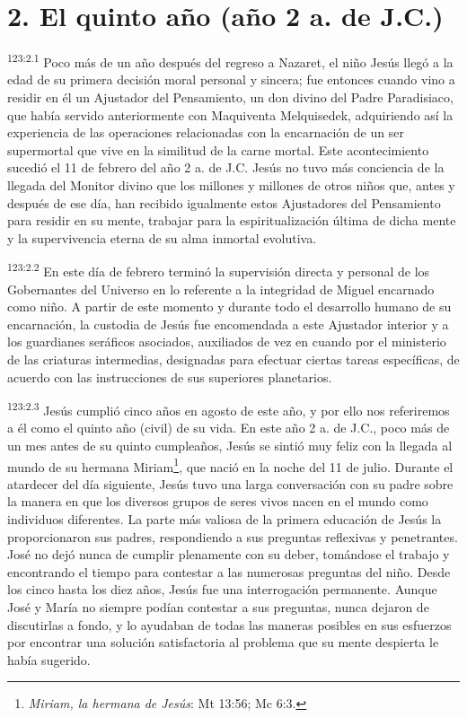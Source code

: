 \section*{2. El quinto año (año 2 a. de J.C.)}
\par 
\textsuperscript{123:2.1} Poco más de un año después del regreso a Nazaret, el niño Jesús llegó a la edad de su primera decisión moral personal y sincera; fue entonces cuando vino a residir en él un Ajustador del Pensamiento, un don divino del Padre Paradisiaco, que había servido anteriormente con Maquiventa Melquisedek, adquiriendo así la experiencia de las operaciones relacionadas con la encarnación de un ser supermortal que vive en la similitud de la carne mortal. Este acontecimiento sucedió el 11 de febrero del año 2 a. de J.C. Jesús no tuvo más conciencia de la llegada del Monitor divino que los millones y millones de otros niños que, antes y después de ese día, han recibido igualmente estos Ajustadores del Pensamiento para residir en su mente, trabajar para la espiritualización última de dicha mente y la supervivencia eterna de su alma inmortal evolutiva.

\par 
\textsuperscript{123:2.2} En este día de febrero terminó la supervisión directa y personal de los Gobernantes del Universo en lo referente a la integridad de Miguel encarnado como niño. A partir de este momento y durante todo el desarrollo humano de su encarnación, la custodia de Jesús fue encomendada a este Ajustador interior y a los guardianes seráficos asociados, auxiliados de vez en cuando por el ministerio de las criaturas intermedias, designadas para efectuar ciertas tareas específicas, de acuerdo con las instrucciones de sus superiores planetarios.

\par 
\textsuperscript{123:2.3} Jesús cumplió cinco años en agosto de este año, y por ello nos referiremos a él como el quinto año (civil) de su vida. En este año 2 a. de J.C., poco más de un mes antes de su quinto cumpleaños, Jesús se sintió muy feliz con la llegada al mundo de su hermana Miriam\footnote{\textit{Miriam, la hermana de Jesús}: Mt 13:56; Mc 6:3.}, que nació en la noche del 11 de julio. Durante el atardecer del día siguiente, Jesús tuvo una larga conversación con su padre sobre la manera en que los diversos grupos de seres vivos nacen en el mundo como individuos diferentes. La parte más valiosa de la primera educación de Jesús la proporcionaron sus padres, respondiendo a sus preguntas reflexivas y penetrantes. José no dejó nunca de cumplir plenamente con su deber, tomándose el trabajo y encontrando el tiempo para contestar a las numerosas preguntas del niño. Desde los cinco hasta los diez años, Jesús fue una interrogación permanente. Aunque José y María no siempre podían contestar a sus preguntas, nunca dejaron de discutirlas a fondo, y lo ayudaban de todas las maneras posibles en sus esfuerzos por encontrar una solución satisfactoria al problema que su mente despierta le había sugerido.

